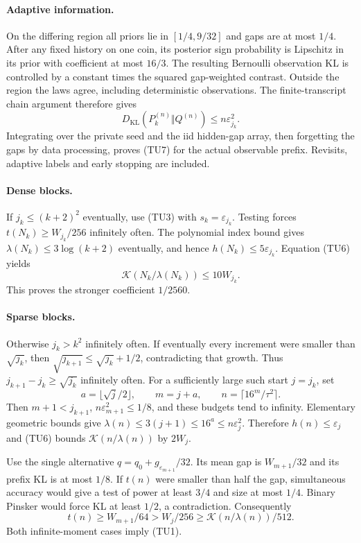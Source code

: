 \paragraph{Adaptive information.}
On the differing region all priors lie in $[1/4,9/32]$ and gaps are at
most $1/4$. After any fixed history on one coin, its posterior sign
probability is Lipschitz in its prior with coefficient at most $16/3$.
The resulting Bernoulli observation KL is controlled by a constant times
the squared gap-weighted contrast. Outside the region the laws agree,
including deterministic observations.
The finite-transcript chain argument therefore gives
\[
 D_{\mathrm{KL}}(P_k^{(n)}\Vert Q^{(n)})\le n\varepsilon_{j_k}^2.
 \tag{TU7}
\]
Integrating over the private seed and the iid hidden-gap array, then
forgetting the gaps by data processing, proves (TU7) for the actual
observable prefix. Revisits, adaptive labels and early stopping are included.

\paragraph{Dense blocks.}
If $j_k\le(k+2)^2$ eventually, use (TU3) with $s_k=\varepsilon_{j_k}$.
Testing forces $t(N_k)\ge W_{j_k}/256$ infinitely often.
The polynomial index bound gives $\lambda(N_k)\le3\log(k+2)$ eventually,
and hence $h(N_k)\le5\varepsilon_{j_k}$. Equation (TU6) yields
\[
 \mathcal K(N_k/\lambda(N_k))\le10W_{j_k}.
\]
This proves the stronger coefficient $1/2560$.

\paragraph{Sparse blocks.}
Otherwise $j_k>k^2$ infinitely often. If eventually every increment were
smaller than $\sqrt{j_k}$, then
$\sqrt{j_{k+1}}\le\sqrt{j_k}+1/2$, contradicting that growth.
Thus $j_{k+1}-j_k\ge\sqrt{j_k}$ infinitely often.
For a sufficiently large such start $j=j_k$, set
\[
 a=\lfloor\sqrt j/2\rfloor,\qquad m=j+a,\qquad
 n=\lceil16^m/\tau^2\rceil.
\]
Then $m+1<j_{k+1}$, $n\varepsilon_{m+1}^2\le1/8$, and these budgets
tend to infinity. Elementary geometric bounds give
$\lambda(n)\le3(j+1)\le16^a\le n\varepsilon_j^2$.
Therefore $h(n)\le\varepsilon_j$ and (TU6) bounds
$\mathcal K(n/\lambda(n))$ by $2W_j$.

Use the single alternative $q=q_0+g_{\varepsilon_{m+1}}/32$.
Its mean gap is $W_{m+1}/32$ and its prefix KL is at most $1/8$.
If $t(n)$ were smaller than half the gap, simultaneous accuracy would give
a test of power at least $3/4$ and size at most $1/4$.
Binary Pinsker would force KL at least $1/2$, a contradiction.
Consequently
\[
 t(n)\ge W_{m+1}/64>W_j/256
       \ge\mathcal K(n/\lambda(n))/512.
 \tag{TU8}
\]
Both infinite-moment cases imply (TU1).


